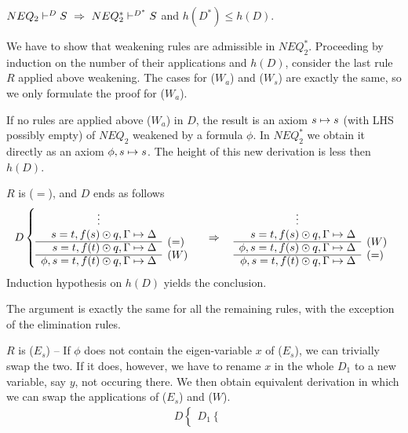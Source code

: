 \begin{LEMMA}\label{le:noweak}
 ${NEQ_2}\vdash^{{D}}S\ \mathrel\Rightarrow\ {NEQ_2^*}\vdash^{{D^*}}S$ and $h(D^*)\leq h(D)$.
\end{LEMMA}
\begin{PROOF}
We have to show that weakening rules are admissible in $NEQ_2^*$. Proceeding
by induction on the number of their applications and $h(D)$, consider the
last rule $R$ applied above weakening. The cases for ($W_a$) and ($W_s$) are
exactly the same, so we only formulate the proof for ($W_a$).
\begin{LS}
\item If no rules are applied above ($W_a$) in $D$, the result is an axiom
 $s\mathrel{\mapsto} s$ (with LHS possibly empty) of
 $NEQ_2$ weakened by a formula $\phi$. In $NEQ_2^*$ we obtain it directly as
 an axiom $\phi,s \mathrel{\mapsto} s$. The height of this new derivation is less then $h(D)$.
\item $R$ is ($=$), and $D$ ends as follows
\[ D \left \{ \begin{array}{rl}
 \multicolumn{1}{c}{\vdots} \\
 s=t, f(s)\odot q, \GSD \\ \cline{1-1}
 s=t, f(t)\odot q, \GSD & \rabove{(=)} \\ \cline{1-1}
 \phi, s=t, f(t)\odot q, \GSD & \rabove{(W)} \end{array} \right . \conv
 \begin{array}{rl}
 \multicolumn{1}{c}{\vdots} \\
 s=t, f(s)\odot q, \GSD \\ \cline{1-1}
 \phi, s=t, f(s)\odot q, \GSD & \rabove{(W)} \\ \cline{1-1}
 \phi, s=t, f(t)\odot q, \GSD & \rabove{(=)} \end{array} \]
Induction hypothesis on $h(D)$ yields the conclusion.
\item The argument is exactly the same for all the remaining rules, with the
exception of the elimination rules.
\item $R$ is ($E_s$) -- 
If $\phi$ does not contain the eigen-variable $x$ of ($E_s$), we can
trivially swap the two. If it does, however, we have to rename $x$ in the
whole $D_1$ to a new variable, say $y$, not occuring there. We then obtain
equivalent derivation in which we can swap the applications of ($E_s$) and ($W$).
\[ \begin{array}{lll}
D \left \{ \begin{array}{cl}
 D_1 \left \{ \begin{array}{rl}

\end{array}
\end{array}
\end{array}\]
\end{LS}
\end{PROOF}
